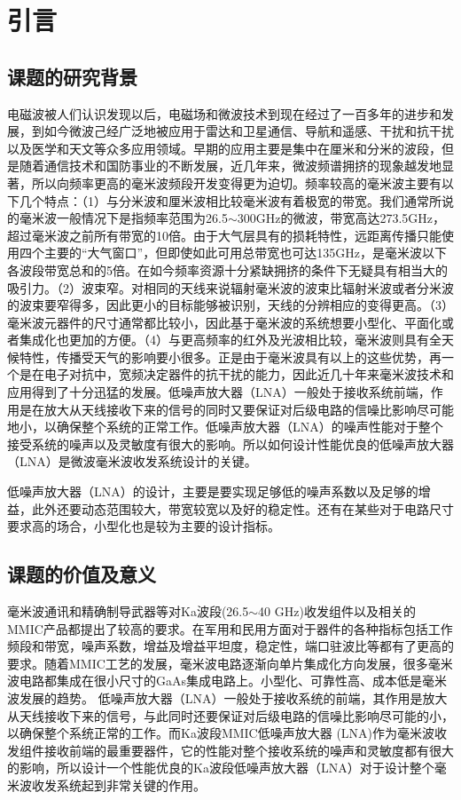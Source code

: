 
\chapter{引言}

\section{课题的研究背景}

电磁波被人们认识发现以后，电磁场和微波技术到现在经过了一百多年的进步和发展，到如今微波己经广泛地被应用于雷达和卫星通信、导航和遥感、干扰和抗干扰以及医学和天文等众多应用领域。早期的应用主要是集中在厘米和分米的波段，但是随着通信技术和国防事业的不断发展，近几年来，微波频谱拥挤的现象越发地显著，所以向频率更高的毫米波频段开发变得更为迫切。频率较高的毫米波主要有以下几个特点：（1）与分米波和厘米波相比较毫米波有着极宽的带宽。我们通常所说的毫米波一般情况下是指频率范围为26.5$\sim$300GHz的微波，带宽高达273.5GHz，超过毫米波之前所有带宽的10倍。由于大气层具有的损耗特性，远距离传播只能使用四个主要的“大气窗口”，但即使如此可用总带宽也可达135GHz，是毫米波以下各波段带宽总和的5倍。在如今频率资源十分紧缺拥挤的条件下无疑具有相当大的吸引力。（2）波束窄。对相同的天线来说辐射毫米波的波束比辐射米波或者分米波的波束要窄得多，因此更小的目标能够被识别，天线的分辨相应的变得更高。（3）毫米波元器件的尺寸通常都比较小，因此基于毫米波的系统想要小型化、平面化或者集成化也更加的方便。（4）与更高频率的红外及光波相比较，毫米波则具有全天候特性，传播受天气的影响要小很多。正是由于毫米波具有以上的这些优势，再一个是在电子对抗中，宽频决定器件的抗干扰的能力，因此近几十年来毫米波技术和应用得到了十分迅猛的发展。低噪声放大器（LNA）一般处于接收系统前端，作用是在放大从天线接收下来的信号的同时又要保证对后级电路的信噪比影响尽可能地小，以确保整个系统的正常工作。低噪声放大器（LNA）的噪声性能对于整个接受系统的噪声以及灵敏度有很大的影响。所以如何设计性能优良的低噪声放大器（LNA）是微波毫米波收发系统设计的关键。

低噪声放大器（LNA）的设计，主要是要实现足够低的噪声系数以及足够的增益，此外还要动态范围较大，带宽较宽以及好的稳定性。还有在某些对于电路尺寸要求高的场合，小型化也是较为主要的设计指标。

\section{课题的价值及意义}

毫米波通讯和精确制导武器等对Ka波段(26.5$\sim$40 GHz)收发组件以及相关的 MMIC产品都提出了较高的要求。在军用和民用方面对于器件的各种指标包括工作频段和带宽，噪声系数，增益及增益平坦度，稳定性，端口驻波比等都有了更高的要求。随着MMIC工艺的发展，毫米波电路逐渐向单片集成化方向发展，很多毫米波电路都集成在很小尺寸的GaAs集成电路上。小型化、可靠性高、成本低是毫米波发展的趋势。
低噪声放大器（LNA）一般处于接收系统的前端，其作用是放大从天线接收下来的信号，与此同时还要保证对后级电路的信噪比影响尽可能的小，以确保整个系统正常的工作。而Ka波段MMIC低噪声放大器 (LNA)作为毫米波收发组件接收前端的最重要器件，它的性能对整个接收系统的噪声和灵敏度都有很大的影响，所以设计一个性能优良的Ka波段低噪声放大器（LNA）对于设计整个毫米波收发系统起到非常关键的作用。

